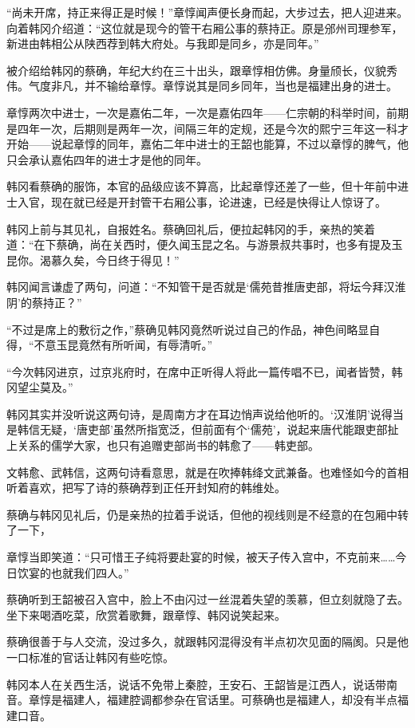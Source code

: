 “尚未开席，持正来得正是时候！”章惇闻声便长身而起，大步过去，把人迎进来。向着韩冈介绍道：“这位就是现今的管干右厢公事的蔡持正。原是邠州司理参军，新进由韩相公从陕西荐到韩大府处。与我即是同乡，亦是同年。”

被介绍给韩冈的蔡确，年纪大约在三十出头，跟章惇相仿佛。身量颀长，仪貌秀伟。气度非凡，并不输给章惇。章惇说其是同乡同年，当也是福建出身的进士。

章惇两次中进士，一次是嘉佑二年，一次是嘉佑四年——仁宗朝的科举时间，前期是四年一次，后期则是两年一次，间隔三年的定规，还是今次的熙宁三年这一科才开始——说起章惇的同年，嘉佑二年中进士的王韶也能算，不过以章惇的脾气，他只会承认嘉佑四年的进士才是他的同年。

韩冈看蔡确的服饰，本官的品级应该不算高，比起章惇还差了一些，但十年前中进士入官，现在就已经是开封管干右厢公事，论进速，已经是快得让人惊讶了。

韩冈上前与其见礼，自报姓名。蔡确回礼后，便拉起韩冈的手，亲热的笑着道：“在下蔡确，尚在关西时，便久闻玉昆之名。与游景叔共事时，也多有提及玉昆你。渴慕久矣，今日终于得见！”

韩冈闻言谦虚了两句，问道：“不知管干是否就是‘儒苑昔推唐吏部，将坛今拜汉淮阴’的蔡持正？”

“不过是席上的敷衍之作，”蔡确见韩冈竟然听说过自己的作品，神色间略显自得，“不意玉昆竟然有所听闻，有辱清听。”

“今次韩冈进京，过京兆府时，在席中正听得人将此一篇传唱不已，闻者皆赞，韩冈望尘莫及。”

韩冈其实并没听说这两句诗，是周南方才在耳边悄声说给他听的。‘汉淮阴’说得当是韩信无疑，‘唐吏部’虽然所指宽泛，但前面有个‘儒苑’，说起来唐代能跟吏部扯上关系的儒学大家，也只有追赠吏部尚书的韩愈了——韩吏部。

文韩愈、武韩信，这两句诗看意思，就是在吹捧韩绛文武兼备。也难怪如今的首相听着喜欢，把写了诗的蔡确荐到正任开封知府的韩维处。

蔡确与韩冈见礼后，仍是亲热的拉着手说话，但他的视线则是不经意的在包厢中转了一下，

章惇当即笑道：“只可惜王子纯将要赴宴的时候，被天子传入宫中，不克前来……今日饮宴的也就我们四人。”

蔡确听到王韶被召入宫中，脸上不由闪过一丝混着失望的羡慕，但立刻就隐了去。坐下来喝酒吃菜，欣赏着歌舞，跟章惇、韩冈说笑起来。

蔡确很善于与人交流，没过多久，就跟韩冈混得没有半点初次见面的隔阂。只是他一口标准的官话让韩冈有些吃惊。

韩冈本人在关西生活，说话不免带上秦腔，王安石、王韶皆是江西人，说话带南音。章惇是福建人，福建腔调都参杂在官话里。可蔡确也是福建人，却没有半点福建口音。

